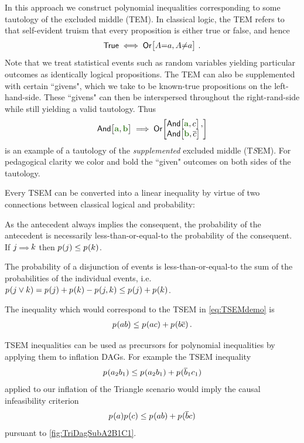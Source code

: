 {In this approach we construct polynomial inequalities corresponding to some tautology of the excluded middle (TEM). In classical logic, the TEM refers to that self-evident truism that every proposition is either true or false, and hence 
\begin{align}
\mathsf{True} \iff \NamedFunction{Or}{ A\cramp{=}a , A\cramp{\neq}a }\,.
\end{align}
Note that we treat statistical events such as random variables yielding particular outcomes as identically logical propositions. The TEM can also be supplemented with certain ``givens", which we take to be known-true propositions on the left-hand-side. These ``givens" can then be interspersed throughout the right-rand-side while still yielding a valid tautology. Thus
\begin{align}\label{eq:TSEMdemo}
\NamedFunction{And}{ \mgreen{a} , \mgreen{b} }
\implies 
\NamedFunction{Or}{
    \NamedFunction{And}{ \mgreen{a} , c } ,\\
    \NamedFunction{And}{ \mgreen{b} , \n{c} }
}
\end{align}
is an example of a tautology of the \emph{supplemented} excluded middle (T\emph{S}EM). For pedagogical clarity we color and bold the ``given" outcomes on both sides of the tautology.

Every TSEM can be converted into a linear inequality by virtue of two connections between classical logical and probability:
\begin{compactenum}
\item As the antecedent always implies the consequent, the probability of the antecedent is necessarily less-than-or-equal-to the probability of the consequent. If $j \mathord{\scriptstyle \implies} k$ then ${p_{}}\lparen j\rparen\leq{p_{}}\lparen k\rparen$.
\item The probability of a disjunction of events is less-than-or-equal-to the sum of the probabilities of the individual events, i.e. ${{p_{}}\lparen j\lor k\rparen={p_{}}\lparen j\rparen+{p_{}}\lparen k\rparen-{p_{}}\lparen j,k\rparen\leq {p_{}}\lparen j\rparen+{p_{}}\lparen k\rparen}$.
\end{compactenum}
The inequality which would correspond to the TSEM in \cref{eq:TSEMdemo} is 
\begin{align}
    {p_{}}\lparen a b\rparen \leq {p_{}}\lparen a c\rparen+{p_{}}\lparen b \overline{c}\rparen\,.
\end{align}

TSEM inequalities can be used as precursors for polynomial inequalities by applying them to inflation DAGs. For example the TSEM inequality
\begin{align}
    {p_{}}\lparen a_2 b_1\rparen \leq {p_{}}\lparen a_2 b_1\rparen+{p_{}}\lparen\overline{b}_1 c_1\rparen
\end{align}
applied to our inflation of the Triangle scenario would imply the causal infeasibility criterion  
\begin{align}
    {p_{}}\lparen a\rparen{p_{}}\lparen c\rparen \leq {p_{}}\lparen a b\rparen+{p_{}}\lparen\overline{b} c\rparen
\end{align}
pursuant to \cref{fig:TriDagSubA2B1C1}.

}
